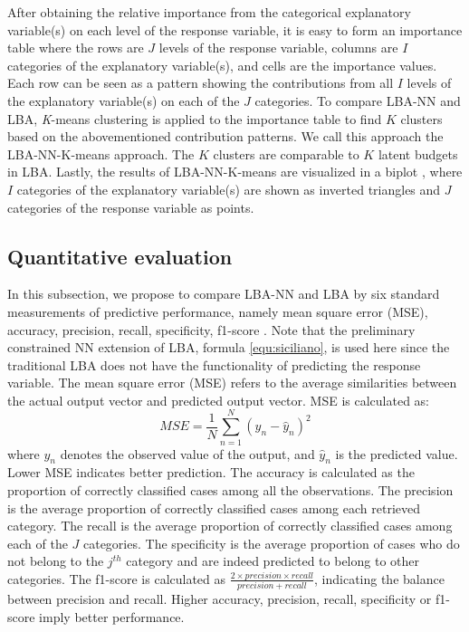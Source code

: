 \documentclass[]{interact}
\theoremstyle{plain}%
\theoremstyle{definition}
\theoremstyle{remark}
\begin{document}
After obtaining the relative importance from the categorical explanatory
variable(s) on each level of the response variable, it is easy to form
an importance table where the rows are \(J\) levels of the response
variable, columns are \(I\) categories of the explanatory variable(s),
and cells are the importance values. Each row can be seen as a pattern
showing the contributions from all \(I\) levels of the explanatory
variable(s) on each of the \(J\) categories. To compare LBA-NN and LBA,
\emph{K}-means clustering \citep{hartigan1979} is applied to the
importance table to find \(K\) clusters based on the abovementioned
contribution patterns. We call this approach the LBA-NN-K-means
approach. The \(K\) clusters are comparable to \(K\) latent budgets in
LBA. Lastly, the results of LBA-NN-K-means are visualized in a biplot
\citep{gabriel1971}, where \(I\) categories of the explanatory
variable(s) are shown as inverted triangles and \(J\) categories of the
response variable as points.

\hypertarget{subsection:quanti}{%
\subsection{Quantitative evaluation}\label{subsection:quanti}}

In this subsection, we propose to compare LBA-NN and LBA by six standard
measurements of predictive performance, namely mean square error (MSE),
accuracy, precision, recall, specificity, f1-score \citep{lever2016}.
Note that the preliminary constrained NN extension of LBA, formula
\ref{equ:siciliano}, is used here since the traditional LBA does not
have the functionality of predicting the response variable. The mean
square error (MSE) refers to the average similarities between the actual
output vector and predicted output vector. MSE is calculated as:
\begin{equation}
  MSE = \frac{1}{N}\sum_{n=1}^N{(y_n - \hat{y}_n)^2} \tag{5}
\end{equation} where \(y_n\) denotes the observed value of the output,
and \(\hat{y}_n\) is the predicted value. Lower MSE indicates better
prediction. The accuracy is calculated as the proportion of correctly
classified cases among all the observations. The precision is the
average proportion of correctly classified cases among each retrieved
category. The recall is the average proportion of correctly classified
cases among each of the \(J\) categories. The specificity is the average
proportion of cases who do not belong to the \(j^{th}\) category and are
indeed predicted to belong to other categories. The f1-score is
calculated as
\(\frac{2\times precision \times recall}{precision + recall}\),
indicating the balance between precision and recall. Higher accuracy,
precision, recall, specificity or f1-score imply better performance.
\end{document}
